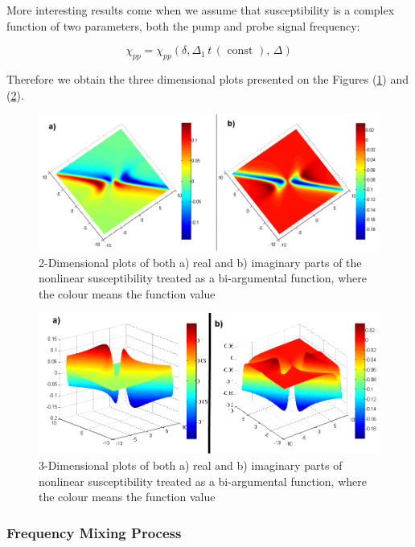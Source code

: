 \documentclass[12pt,twoside,a4paper]{article}
\numberwithin{equation}{subsection}
\numberwithin{figure}{subsection}
\begin{document}
More interesting results come when we assume that susceptibility is a complex function of two parameters, both the pump and
probe signal frequency:

\begin{equation} \label{eq:pnp_2args}
  \chi_{pp} = \chi_{pp}(\delta, \Delta_1 \, t \, (\text{ const }), \,\Delta )
\end{equation}

Therefore we obtain the three dimensional plots presented on the Figures (\ref{fig:physical_pnp_2d}) and (\ref{fig:physical_pnp_3d}).

\begin{figure}
  \includegraphics[width=150mm]{img/pnp_2d.png}
  \caption{2-Dimensional plots of both a) real and b) imaginary parts of the nonlinear susceptibility treated as a bi-argumental
  function, where the colour means the function value
  \label{fig:physical_pnp_2d}}
\end{figure}

\begin{figure} 
  \includegraphics[width=150mm]{img/pnp_3d.png}
  \caption{3-Dimensional plots of both a) real and b) imaginary parts of nonlinear susceptibility treated as a bi-argumental
  function, where the colour means the function value
  \label{fig:physical_pnp_3d}}
\end{figure}


\subsubsection*{Frequency Mixing Process}
\end{document}
